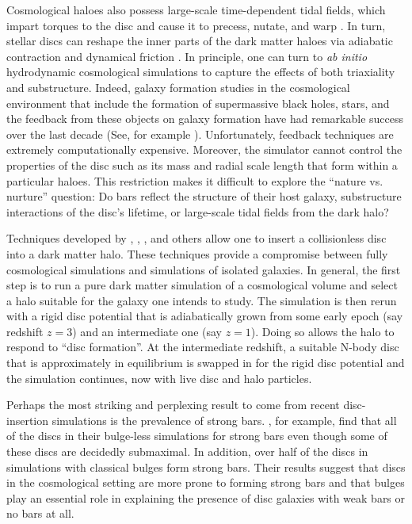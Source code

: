 Cosmological haloes also possess large-scale time-dependent tidal
fields, which impart torques to the disc and cause it to precess,
nutate, and warp
\citep{dubinski1995,binney1998,dubinski2009,Bauer2018a}.  In turn,
stellar discs can reshape the inner parts of the dark matter haloes
via adiabatic contraction and dynamical friction
\citep{blumenthal1986, ryden1987, dubinski1994,
  DubinskiKuijkenRigidDisks,
  DeBuhrStellarDisks,YurinSpringelStellarDisks, Bauer2018a}.  In
principle, one can turn to {\it ab initio} hydrodynamic cosmological
simulations to capture the effects of both triaxiality and
substructure.  Indeed, galaxy formation studies in the cosmological
environment that include the formation of supermassive black holes,
stars, and the feedback from these objects on galaxy formation have
had remarkable success over the last decade (See, for
  example \citet{IllustrisFeedback, Eagle}).  Unfortunately, feedback
techniques are extremely computationally expensive.  Moreover, the
simulator cannot control the properties of the disc such as its mass
and radial scale length that form within a particular haloes.  This
restriction makes it difficult to explore the ``nature vs. nurture''
question: Do bars reflect the structure of their host galaxy,
substructure interactions of the disc's lifetime, or large-scale tidal
fields from the dark halo?

Techniques developed by \citet{BerentzenShlosmanStellarDisks},
\citet{DeBuhrStellarDisks}, \citet{YurinSpringelStellarDisks},
\citet{Bauer2018a} and others allow one to insert a collisionless disc
into a dark matter halo.  These techniques provide a compromise
between fully cosmological simulations and simulations of isolated
galaxies.  In general, the first step is to run a pure dark matter
simulation of a cosmological volume and select a halo suitable for the
galaxy one intends to study.  The simulation is then rerun with a rigid
disc potential that is adiabatically grown from some early epoch (say
redshift $z=3$) and an intermediate one (say $z=1$).  Doing so allows
the halo to respond to ``disc formation''.  At the intermediate
redshift, a suitable N-body disc that is approximately in equilibrium
is swapped in for the rigid disc potential and the simulation
continues, now with live disc and halo particles.

Perhaps the most striking and perplexing result to come from recent
disc-insertion simulations is the prevalence of strong bars.
\citet{YurinSpringelStellarDisks}, for example, find that all of the
discs in their bulge-less simulations for strong bars even though some
of these discs are decidedly submaximal.  In addition, over half of
the discs in simulations with classical bulges form strong bars.
Their results suggest that discs in the cosmological setting are more
prone to forming strong bars and that bulges play an essential role in
explaining the presence of disc galaxies with weak bars or no bars at
all.

